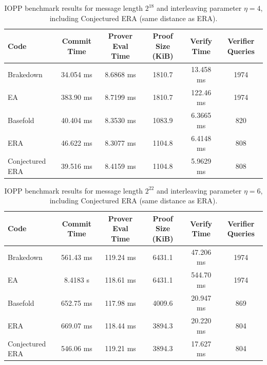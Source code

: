 \begin{table}[htbp]
\centering
\begin{tabular}{lccccc}
\hline
Code & Commit Time & Prover Eval Time & Proof Size (KiB) & Verify Time & Verifier Queries \\
\hline
Brakedown & 34.054 ms & 8.6868 ms & 1810.7 & 13.458 ms & 1974 \\
EA & 383.90 ms & 8.7199 ms & 1810.7 & 122.46 ms & 1974 \\
Basefold & 40.404 ms & 8.3530 ms & 1083.9 & 6.3665 ms & 820 \\
ERA & 46.622 ms & 8.3077 ms & 1104.8 & 6.4148 ms & 808 \\
Conjectured ERA & 39.516 ms & 8.4159 ms & 1104.8 & 5.9629 ms & 808 \\
\hline
\end{tabular}
\caption{IOPP benchmark results for message length $2^{18}$ and interleaving parameter $\eta=4$, including Conjectured ERA (same distance as ERA).}
\label{tab:iopp-218-eta4-with-conj-era}
\end{table}

\begin{table}[htbp]
\centering
\begin{tabular}{lccccc}
\hline
Code & Commit Time & Prover Eval Time & Proof Size (KiB) & Verify Time & Verifier Queries \\
\hline
Brakedown & 561.43 ms & 119.24 ms & 6431.1 & 47.206 ms & 1974 \\
EA & 8.4183 s & 118.61 ms & 6431.1 & 544.70 ms & 1974 \\
Basefold & 652.75 ms & 117.98 ms & 4009.6 & 20.947 ms & 869 \\
ERA & 669.07 ms & 118.44 ms & 3894.3 & 20.220 ms & 804 \\
Conjectured ERA & 546.06 ms & 119.21 ms & 3894.3 & 17.627 ms & 804 \\
\hline
\end{tabular}
\caption{IOPP benchmark results for message length $2^{22}$ and interleaving parameter $\eta=6$, including Conjectured ERA (same distance as ERA).}
\label{tab:iopp-222-eta6-with-conj-era}
\end{table}
